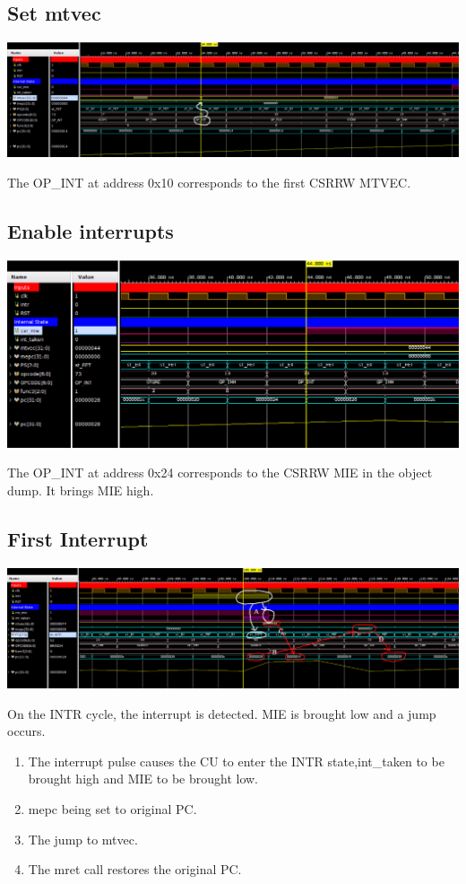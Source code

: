 \documentclass{article}
\begin{document}
\begin{landscape}
    \subsection*{Set mtvec}
    \includegraphics[width=\linewidth]{wf7.png}

    The OP\_INT at address 0x10 corresponds to the first CSRRW MTVEC.

    \subsection*{Enable interrupts}
    \includegraphics[width=\linewidth]{wf6.png}

    The OP\_INT at address 0x24 corresponds to the CSRRW MIE in the object dump. It brings MIE high.

    \subsection*{First Interrupt}
    \includegraphics[width=\linewidth]{wf3.png}

    On the INTR cycle, the interrupt is detected. MIE is brought low and a jump occurs. 

    \begin{enumerate}[label=\Alph*.]
        \item The interrupt pulse causes the CU to enter the INTR state,int\_taken to be brought high and MIE to be brought low.
        \item mepc being set to original PC.
        \item The jump to mtvec.
        \item The mret call restores the original PC.
    \end{enumerate}


\end{landscape}
\end{document}
